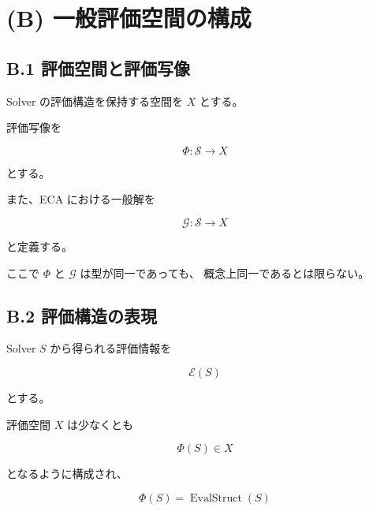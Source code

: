 \documentclass[a4paper,11pt]{article}
\newcommand{\Solver}{\mathcal{S}}
\newcommand{\Eval}{\mathcal{G}}
\begin{document}

\section{(B) 一般評価空間の構成}

\subsection{B.1 評価空間と評価写像}

Solver の評価構造を保持する空間を $X$ とする。

評価写像を

\begin{equation}
    \Phi:
    \Solver\longrightarrow X
\end{equation}

とする。

また、ECA における一般解を

\begin{equation}
    \Eval:
    \Solver\longrightarrow X
\end{equation}

と定義する。

ここで $\Phi$ と $\Eval$ は型が同一であっても、
概念上同一であるとは限らない。


\subsection{B.2 評価構造の表現}

Solver $S$ から得られる評価情報を

\begin{equation}
    \mathcal{E}(S)
\end{equation}

とする。

評価空間 $X$ は少なくとも

\begin{equation}
    \Phi(S)\in X
\end{equation}

となるように構成され、

\begin{equation}
    \Phi(S)
    =
    \operatorname{EvalStruct}(S)
\end{equation}
\end{document}
